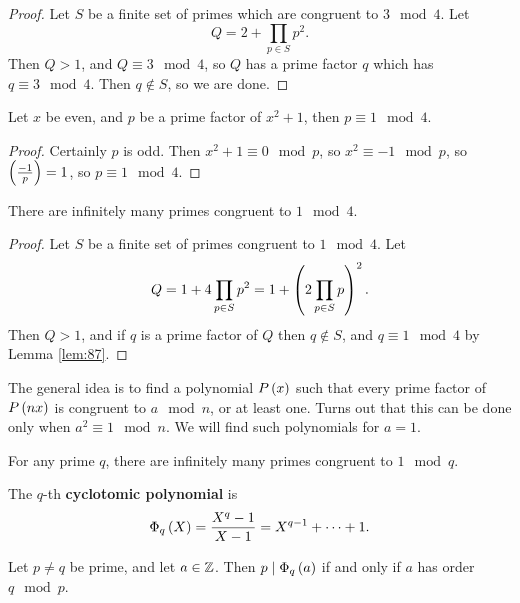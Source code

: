 \begin{proof}
Let $ S $ be a finite set of primes which are congruent to $ 3 \mod 4 $. Let
$$ Q = 2 + \prod_{p \in S} p^2. $$
Then $ Q > 1 $, and $ Q \equiv 3 \mod 4 $, so $ Q $ has a prime factor $ q $ which has $ q \equiv 3 \mod 4 $. Then $ q \notin S $, so we are done.
\end{proof}

\begin{lemma}
\label{lem:87}
Let $ x $ be even, and $ p $ be a prime factor of $ x^2 + 1 $, then $ p \equiv 1 \mod 4 $.
\end{lemma}

\begin{proof}
Certainly $ p $ is odd. Then $ x^2 + 1 \equiv 0 \mod p $, so $ x^2 \equiv -1 \mod p $, so $ \jacobi{-1}{p} = 1 $, so $ p \equiv 1 \mod 4 $.
\end{proof}

\begin{theorem}
There are infinitely many primes congruent to $ 1 \mod 4 $.
\end{theorem}

\begin{proof}
Let $ S $ be a finite set of primes congruent to $ 1 \mod 4 $. Let
$$ Q = 1 + 4\prod_{p \in S} p^2 = 1 + \br{2\prod_{p \in S} p}^2. $$
Then $ Q > 1 $, and if $ q $ is a prime factor of $ Q $ then $ q \notin S $, and $ q \equiv 1 \mod 4 $ by Lemma \ref{lem:87}.
\end{proof}

The general idea is to find a polynomial $ P\br{x} $ such that every prime factor of $ P\br{nx} $ is congruent to $ a \mod n $, or at least one. Turns out that this can be done only when $ a^2 \equiv 1 \mod n $. We will find such polynomials for $ a = 1 $.

\begin{theorem}
For any prime $ q $, there are infinitely many primes congruent to $ 1 \mod q $.
\end{theorem}

\begin{definition}
The $ q $-th \textbf{cyclotomic polynomial} is
$$ \Phi_q\br{X} = \dfrac{X^q - 1}{X - 1} = X^{q - 1} + \dots + 1. $$
\end{definition}

\pagebreak

\begin{theorem}
\label{thm:91}
Let $ p \ne q $ be prime, and let $ a \in \mathbb{Z} $. Then $ p \mid \Phi_q\br{a} $ if and only if $ a $ has order $ q \mod p $.
\end{theorem}

